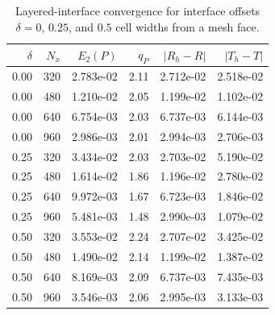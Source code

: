 \begin{table}[htbp]
\centering
\begin{tabular}{rrrrrr}
\toprule
$\delta$ & $N_x$ & $E_2(P)$ & $q_P$ & $|R_h-R|$ & $|T_h-T|$ \\
\midrule
0.00 & 320 & 2.783e-02 & 2.11 & 2.712e-02 & 2.518e-02 \\
0.00 & 480 & 1.210e-02 & 2.05 & 1.199e-02 & 1.102e-02 \\
0.00 & 640 & 6.754e-03 & 2.03 & 6.737e-03 & 6.144e-03 \\
0.00 & 960 & 2.986e-03 & 2.01 & 2.994e-03 & 2.706e-03 \\
0.25 & 320 & 3.434e-02 & 2.03 & 2.703e-02 & 5.190e-02 \\
0.25 & 480 & 1.614e-02 & 1.86 & 1.196e-02 & 2.780e-02 \\
0.25 & 640 & 9.972e-03 & 1.67 & 6.723e-03 & 1.846e-02 \\
0.25 & 960 & 5.481e-03 & 1.48 & 2.990e-03 & 1.079e-02 \\
0.50 & 320 & 3.553e-02 & 2.24 & 2.707e-02 & 3.425e-02 \\
0.50 & 480 & 1.490e-02 & 2.14 & 1.199e-02 & 1.387e-02 \\
0.50 & 640 & 8.169e-03 & 2.09 & 6.737e-03 & 7.435e-03 \\
0.50 & 960 & 3.546e-03 & 2.06 & 2.995e-03 & 3.133e-03 \\
\bottomrule
\end{tabular}
\caption{Layered-interface convergence for interface offsets $\delta=0$, $0.25$, and $0.5$ cell widths from a mesh face.}
\label{tab:interfaceConvergence}
\end{table}
